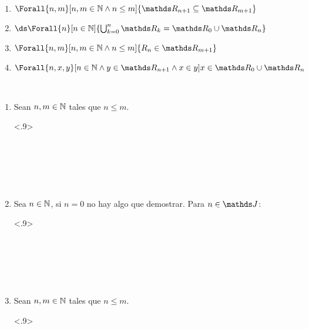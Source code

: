 \begin{lemma}[Propiedades de $\R_n$]\label{lema:Rn}~
  \begin{enumerate}
    \item $\Forall{n,m}[n,m\in\N \land n\leq m]{\R_{n+1} \subseteq \R_{m+1}}$
    \item $\ds\Forall{n}[n\in\N]{\bigcup_{k=0}^n \R_k = \R_0 \cup \R_n}$
    \item $\Forall{n,m}[n,m\in\N \land n \leq m]{R_n \in \R_{m+1}}$
    \item $\Forall{n,x,y}[n\in\N \land y\in\R_{n+1} \land x\in y]{x\in\R_0\cup\R_n}$
  \end{enumerate}
\end{lemma}
\begin{demo}~
  \begin{enumerate}
    \item Sean $n,m\in\mathbb{N}$ tales que $n\leq m$.
          \begin{longderivation}<.9>
              \\
            \equiv\\
              \\
            \To\\
              \\
            \equiv\\
          \end{longderivation}
    \item Sea $n\in\mathbb{N}$, si $n=0$ no hay algo que demostrar. Para $n\in\J$:
          \begin{longderivation}<.9>
              \\
            \equiv\\
              \\
            \\
              \\
            \equiv\\
          \end{longderivation}
    \item Sean $n,m \in \mathbb{N}$ tales que $n \leq m$.
          \begin{longderivation}<.9>
              \\
            \equiv\\

\end{longderivation}
\end{enumerate}
\end{demo}
